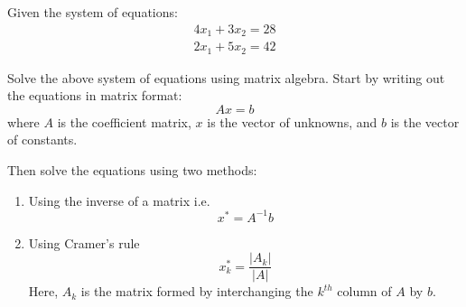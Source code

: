 \documentclass{./../../Latex/handout}
\begin{document}
\thispagestyle{plain}

Given the system of equations:
$$
\begin{array}{l}
4 x_{1}+3 x_{2}=28 \\
2 x_{1}+5 x_{2}=42
\end{array}
$$


Solve the above system of equations using matrix algebra. Start by writing out the equations in matrix format: 
$$ Ax = b $$
where $A$ is the coefficient matrix, $x$ is the vector of unknowns, and $b$ is the vector of constants. 

Then solve the equations using two methods:
\begin{enumerate}
\item Using the inverse of a matrix i.e. $$x^*= A^{-1} b$$
\item Using Cramer's rule $$x^*_k = \frac{|A_k|}{|A|}$$
Here, $A_k$ is the matrix formed by interchanging the $k^{th}$ column of $A$ by $b$.
\end{enumerate} 

 
\end{document}
